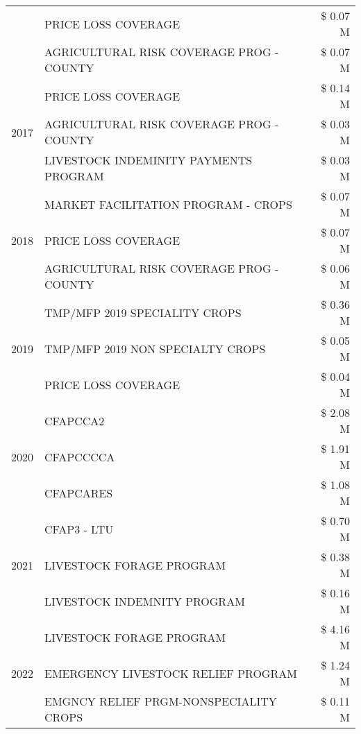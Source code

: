 \begin{tabular}{llr}
 & PRICE LOSS COVERAGE & \$ 0.07 M \\
 & AGRICULTURAL RISK COVERAGE PROG - COUNTY & \$ 0.07 M \\
\cline{1-3}
\multirow[t]{3}{*}{2017} & PRICE LOSS COVERAGE & \$ 0.14 M \\
 & AGRICULTURAL RISK COVERAGE PROG - COUNTY & \$ 0.03 M \\
 & LIVESTOCK INDEMINITY PAYMENTS PROGRAM & \$ 0.03 M \\
\cline{1-3}
\multirow[t]{3}{*}{2018} & MARKET FACILITATION PROGRAM - CROPS & \$ 0.07 M \\
 & PRICE LOSS COVERAGE & \$ 0.07 M \\
 & AGRICULTURAL RISK COVERAGE PROG - COUNTY & \$ 0.06 M \\
\cline{1-3}
\multirow[t]{3}{*}{2019} & TMP/MFP 2019 SPECIALITY CROPS & \$ 0.36 M \\
 & TMP/MFP 2019 NON SPECIALTY CROPS & \$ 0.05 M \\
 & PRICE LOSS COVERAGE & \$ 0.04 M \\
\cline{1-3}
\multirow[t]{3}{*}{2020} & CFAPCCA2 & \$ 2.08 M \\
 & CFAPCCCCA & \$ 1.91 M \\
 & CFAPCARES & \$ 1.08 M \\
\cline{1-3}
\multirow[t]{3}{*}{2021} & CFAP3 - LTU & \$ 0.70 M \\
 & LIVESTOCK FORAGE PROGRAM & \$ 0.38 M \\
 & LIVESTOCK INDEMNITY PROGRAM & \$ 0.16 M \\
\cline{1-3}
\multirow[t]{3}{*}{2022} & LIVESTOCK FORAGE PROGRAM & \$ 4.16 M \\
 & EMERGENCY LIVESTOCK RELIEF PROGRAM & \$ 1.24 M \\
 & EMGNCY RELIEF PRGM-NONSPECIALITY CROPS & \$ 0.11 M \\
\cline{1-3}
\bottomrule
\end{tabular}
